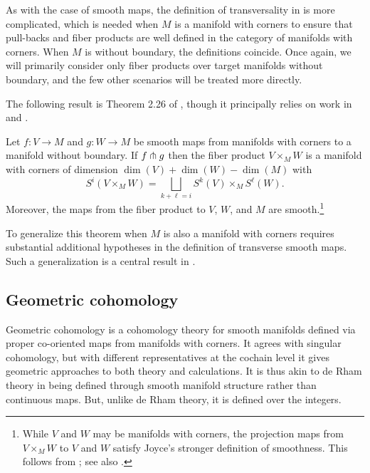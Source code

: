 As with the case of smooth maps, the definition of transversality in \cite{Joy12} is more complicated, which is needed when $M$ is a manifold with corners to ensure that pull-backs and fiber products are well defined in the category of manifolds with corners.
When $M$ is without boundary, the definitions coincide.
Once again, we will primarily consider only fiber products over target manifolds without boundary, and the few other scenarios will be treated more directly.


The following result is Theorem 2.26 of \cite{medina2022foundations}, though it principally relies on work in \cite{Joy12} and \cite{MaDo92}.

\begin{theorem}\label{pullback}
	Let $f \colon V \to M$ and $g \colon W \to M$ be smooth maps from manifolds with corners to a manifold without boundary.
	If $f \pitchfork g$ then the fiber product $V \times_M W$ is a manifold with corners of dimension $\dim(V) + \dim(W) - \dim(M)$ with
	\begin{equation*}
		S^i(V \times_M W) = \bigsqcup_{k + \ell = i} S^k(V) \times_M S^\ell(W).
	\end{equation*}
	Moreover, the maps from the fiber product to $V$, $W$, and $M$ are smooth.\footnote{While $V$ and $W$ may be manifolds with corners, the projection maps from $V \times_M W$ to $V$ and $W$ satisfy Joyce's stronger definition of smoothness.
		This follows from \cite[Theorem 6.4]{Joy12}; see also \cite[Theorem 2.26]{medina2022foundations}.}
\end{theorem}

To generalize this theorem when $M$ is also a manifold with corners requires substantial additional hypotheses in the definition of transverse smooth maps.
Such a generalization is a central result in \cite{Joy12}.

\subsection{Geometric cohomology}

Geometric cohomology is a cohomology theory for smooth manifolds defined via proper co-oriented maps from manifolds with corners.
It agrees with singular cohomology, but with different representatives at the cochain level it gives geometric approaches to both theory and calculations.
It is thus akin to de Rham theory in being defined through smooth manifold structure rather than continuous maps.
But, unlike de Rham theory, it is defined over the integers.

